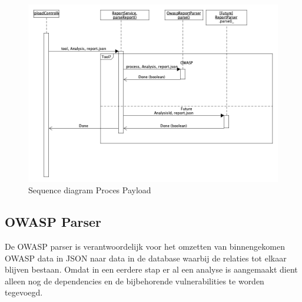 \begin{figure}[bth]
    \myfloatalign
    \includegraphics[width=14cm]{gfx/umlet/exports/SeqProcessPayload}
    \caption{Sequence diagram Proces Payload}
    \label{fig:ProcesPayload}
\end{figure}

\subsection{OWASP Parser}\label{subsec:owasp-parser}
De OWASP parser is verantwoordelijk voor het omzetten van binnengekomen OWASP data in JSON naar data in de database waarbij de relaties tot elkaar blijven bestaan.
Omdat in een eerdere stap er al een analyse is aangemaakt dient alleen nog de dependencies en de bijbehorende vulnerabilities te worden tegevoegd.


